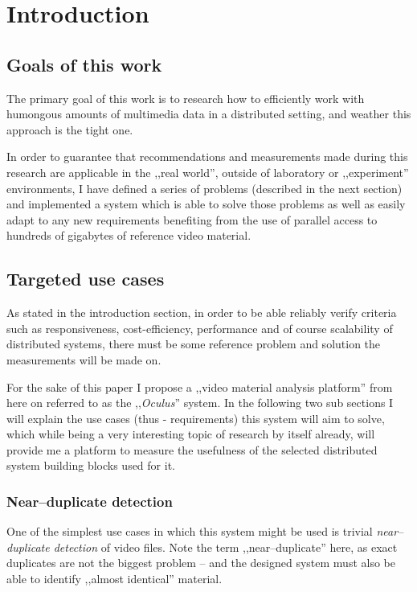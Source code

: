 \chapter{Introduction}



\section{Goals of this work}
The primary goal of this work is to research how to efficiently work with humongous amounts of multimedia data in a distributed setting, and weather this approach is the tight one.

In order to guarantee that recommendations and measurements made during this research are applicable in the ,,real world'', outside of laboratory or ,,experiment'' environments, I have defined a series of problems (described in the next section) and implemented a system which is able to solve those problems as well as easily adapt to any new requirements benefiting from the use of parallel access to hundreds of gigabytes of reference video material.

\section{Targeted use cases}

As stated in the introduction section, in order to be able reliably verify criteria such as responsiveness, cost-efficiency, performance and of course scalability of distributed systems, there must be some reference problem and solution the measurements will be made on. 

For the sake of this paper I propose a ,,video material analysis platform'' from here on referred to as the ,,\textit{Oculus}'' system.
In the following two sub sections I will explain the use cases (thus - requirements) this system will aim to solve, which while being a very interesting 
topic of research by itself already, will provide me a platform to measure the usefulness of the selected distributed system building blocks used for it. 

\subsection{Near--duplicate detection}
One of the simplest use cases in which this system might be used is trivial \textit{near--duplicate detection} of video files.
Note the term ,,near--duplicate'' here, as exact duplicates are not the biggest problem -- and the designed system must also be able to identify ,,almost identical'' material.

